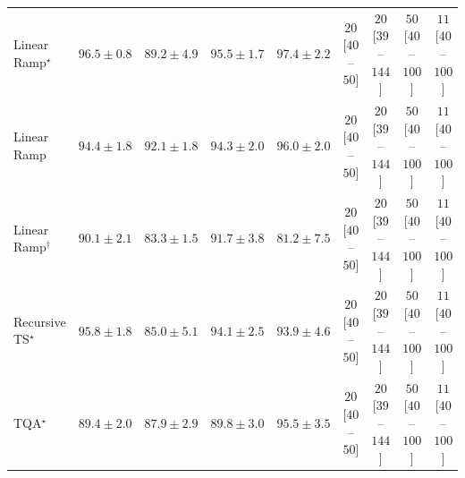 \begin{tabular}{l|cccc|cccc|}
Linear Ramp$^\star$ & {\cellcolor[HTML]{6E096A}} \color[HTML]{F1F1F1} $96.5\pm 0.8$ & {\cellcolor[HTML]{8B60AC}} \color[HTML]{F1F1F1} $89.2\pm 4.9$ & {\cellcolor[HTML]{7C0E78}} \color[HTML]{F1F1F1} $95.5\pm 1.7$ & {\cellcolor[HTML]{5F055C}} \color[HTML]{F1F1F1} $97.4\pm 2.2$ & {\cellcolor[HTML]{FDE4E1}} \color[HTML]{000000} $20$ [$40$--$50$] & {\cellcolor[HTML]{FDE4E1}} \color[HTML]{000000} $20$ [$39$--$144$] & {\cellcolor[HTML]{FCC0BF}} \color[HTML]{000000} $50$ [$40$--$100$] & {\cellcolor[HTML]{FEEEEA}} \color[HTML]{000000} $11$ [$40$--$100$] \\
Linear Ramp & {\cellcolor[HTML]{831A83}} \color[HTML]{F1F1F1} $94.4\pm 1.8$ & {\cellcolor[HTML]{873B99}} \color[HTML]{F1F1F1} $92.1\pm 1.8$ & {\cellcolor[HTML]{831C84}} \color[HTML]{F1F1F1} $94.3\pm 2.0$ & {\cellcolor[HTML]{740B70}} \color[HTML]{F1F1F1} $96.0\pm 2.0$ & {\cellcolor[HTML]{FDE4E1}} \color[HTML]{000000} $20$ [$40$--$50$] & {\cellcolor[HTML]{FDE4E1}} \color[HTML]{000000} $20$ [$39$--$144$] & {\cellcolor[HTML]{FCC0BF}} \color[HTML]{000000} $50$ [$40$--$100$] & {\cellcolor[HTML]{FEEEEA}} \color[HTML]{000000} $11$ [$40$--$100$] \\
Linear Ramp$^\dagger$ & {\cellcolor[HTML]{8A54A6}} \color[HTML]{F1F1F1} $90.1\pm 2.1$ & {\cellcolor[HTML]{94A6CE}} \color[HTML]{F1F1F1} $83.3\pm 1.5$ & {\cellcolor[HTML]{88419D}} \color[HTML]{F1F1F1} $91.7\pm 3.8$ & {\cellcolor[HTML]{9FBCDA}} \color[HTML]{000000} $81.2\pm 7.5$ & {\cellcolor[HTML]{FDE4E1}} \color[HTML]{000000} $20$ [$40$--$50$] & {\cellcolor[HTML]{FDE4E1}} \color[HTML]{000000} $20$ [$39$--$144$] & {\cellcolor[HTML]{FCC0BF}} \color[HTML]{000000} $50$ [$40$--$100$] & {\cellcolor[HTML]{FEEEEA}} \color[HTML]{000000} $11$ [$40$--$100$] \\
Recursive TS$^\star$ & {\cellcolor[HTML]{770C73}} \color[HTML]{F1F1F1} $95.8\pm 1.8$ & {\cellcolor[HTML]{8C93C4}} \color[HTML]{F1F1F1} $85.0\pm 5.1$ & {\cellcolor[HTML]{831F86}} \color[HTML]{F1F1F1} $94.1\pm 2.5$ & {\cellcolor[HTML]{842289}} \color[HTML]{F1F1F1} $93.9\pm 4.6$ & {\cellcolor[HTML]{FDE4E1}} \color[HTML]{000000} $20$ [$40$--$50$] & {\cellcolor[HTML]{FDE4E1}} \color[HTML]{000000} $20$ [$39$--$144$] & {\cellcolor[HTML]{FCC0BF}} \color[HTML]{000000} $50$ [$40$--$100$] & {\cellcolor[HTML]{FEEEEA}} \color[HTML]{000000} $11$ [$40$--$100$] \\
TQA$^\star$ & {\cellcolor[HTML]{8B5DAA}} \color[HTML]{F1F1F1} $89.4\pm 2.0$ & {\cellcolor[HTML]{8C70B3}} \color[HTML]{F1F1F1} $87.9\pm 2.9$ & {\cellcolor[HTML]{8A58A8}} \color[HTML]{F1F1F1} $89.8\pm 3.0$ & {\cellcolor[HTML]{7C0E78}} \color[HTML]{F1F1F1} $95.5\pm 3.5$ & {\cellcolor[HTML]{FDE4E1}} \color[HTML]{000000} $20$ [$40$--$50$] & {\cellcolor[HTML]{FDE4E1}} \color[HTML]{000000} $20$ [$39$--$144$] & {\cellcolor[HTML]{FCC0BF}} \color[HTML]{000000} $50$ [$40$--$100$] & {\cellcolor[HTML]{FEEEEA}} \color[HTML]{000000} $11$ [$40$--$100$] \\

\end{tabular}
